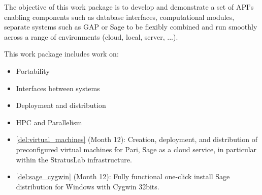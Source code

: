 \addtocounter{wpno}{1}
\begin{Workpackage}{\thewpno}
\WPTitle{\wpname{\thewpno}}

\begin{WPObjectives}
  The objective of this work package is to develop and demonstrate a
  set of API's enabling components such as database interfaces,
  computational modules, separate systems such as GAP or Sage to be
  flexibly combined and run smoothly across a range of environments
  (cloud, local, server, ...).
\end{WPObjectives}

\begin{WPDescription}
  This work package includes work on:
  \begin{itemize}
  \item Portability
  \item Interfaces between systems
  \item Deployment and distribution
  \item HPC and Parallelism
  \end{itemize}
\end{WPDescription}

\begin{WPDeliverables}
\begin{itemize}
\item \ref{del:virtual_machines} (Month 12): Creation, deployment, and
  distribution of preconfigured virtual machines for Pari, Sage as a
  cloud service, in particular within the StratusLab infrastructure.
\item \ref{del:sage_cygwin} (Month 12): Fully functional one-click
  install Sage distribution for Windows with Cygwin 32bits.


\end{itemize}
\end{WPDeliverables}
\end{Workpackage}
